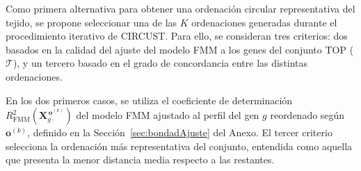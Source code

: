 \documentclass[12pt, a4paper]{report}
\begin{document}
Como primera alternativa para obtener una ordenación circular representativa del tejido, se propone seleccionar una de las \(K\) ordenaciones generadas durante el procedimiento iterativo de CIRCUST. Para ello, se consideran tres criterios: dos basados en la calidad del ajuste del modelo FMM a los genes del conjunto TOP ($\mathcal{T}$), y un tercero basado en el grado de concordancia entre las distintas ordenaciones.

En los dos primeros casos, se utiliza el coeficiente de determinación
\(R^2_{\mathrm{FMM}}\!\left(\mathbf{X}_{g\cdot}^{\,\mathbf{o}^{(k)}}\right)\)
del modelo FMM ajustado al perfil del gen \(g\) reordenado según
\(\mathbf{o}^{(k)}\), definido en la Sección~\ref{sec:bondadAjuste} del Anexo.
El tercer criterio selecciona la ordenación más representativa del
conjunto, entendida como aquella que presenta la menor distancia media
respecto a las restantes.
\end{document}
